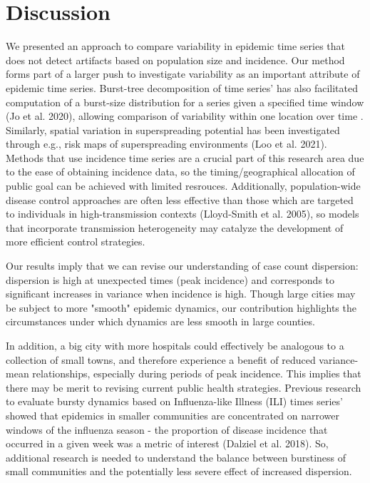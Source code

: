 \documentclass[10pt,letterpaper]{article}
\begin{document}
\section*{Discussion}
We presented an approach to compare variability in epidemic time series that does not detect artifacts based on population size and incidence. Our method forms part of a larger push to investigate variability as an important attribute of epidemic time series. Burst-tree decomposition of time series’ has also facilitated computation of a burst-size distribution for a series given a specified time window (Jo et al. 2020), allowing comparison of variability within one location over time . Similarly, spatial variation in superspreading potential has been investigated through e.g., risk maps of superspreading environments (Loo et al. 2021). Methods that use incidence time series are a crucial part of this research area due to the ease of obtaining incidence data, so the timing/geographical allocation of public  goal can be achieved with limited resrouces. Additionally, population-wide disease control approaches are often less effective than those which are targeted to individuals in high-transmission contexts (Lloyd-Smith et al. 2005), so models that incorporate transmission heterogeneity may catalyze the development of more efficient control strategies.

Our results imply that we can revise our understanding of case count dispersion: dispersion is high at unexpected times (peak incidence) and corresponds to significant increases in variance when incidence is high. Though large cities may be subject to more "smooth" epidemic dynamics, our contribution highlights the circumstances under which dynamics are less smooth in large counties. 

In addition, a big city with more hospitals could effectively be analogous to a collection of small towns, and therefore experience a benefit of reduced variance-mean relationships, especially during periods of peak incidence.
This implies that there may be merit to revising current public health strategies. Previous research to evaluate bursty dynamics based on Influenza-like Illness (ILI) times series’ showed that epidemics in smaller communities are concentrated on narrower windows of the influenza season - the proportion of disease incidence that occurred in a given week was a metric of interest (Dalziel et al. 2018). So, additional research is needed to understand the balance between burstiness of small communities and the potentially less severe effect of increased dispersion.
\end{document}

